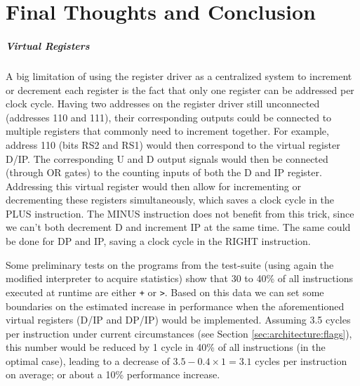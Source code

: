 \chapter{Final Thoughts and Conclusion} \label{sec:finalthoughts}
\paragraph{Virtual Registers} A big limitation of using the register driver as a centralized system to increment or decrement each register is the fact that only one register can be addressed per clock cycle. Having two addresses on the register driver still unconnected (addresses 110 and 111), their corresponding outputs could be connected to multiple registers that commonly need to increment together. For example, address 110 (bits RS2 and RS1) would then correspond to the virtual register D/IP. The corresponding U and D output signals would then be connected (through OR gates) to the counting inputs of both the D and IP register. Addressing this virtual register would then allow for incrementing or decrementing these registers simultaneously, which saves a clock cycle in the PLUS instruction. The MINUS instruction does not benefit from this trick, since we can't both decrement D and increment IP at the same time. The same could be done for DP and IP, saving a clock cycle in the RIGHT instruction.

Some preliminary tests on the programs from the test-suite (using again the modified interpreter to acquire statistics) show that 30 to 40\% of all instructions executed at runtime are either \texttt{+} or \texttt{>}. Based on this data we can set some boundaries on the estimated increase in performance when the aforementioned virtual registers (D/IP and DP/IP) would be implemented. Assuming 3.5 cycles per instruction under current circumstances (see Section \ref{sec:architecture:flags}), this number would be reduced by 1 cycle in 40\% of all instructions (in the optimal case), leading to a decrease of $3.5 - 0.4\times 1 = 3.1$ cycles per instruction on average; or about a 10\% performance increase. 


